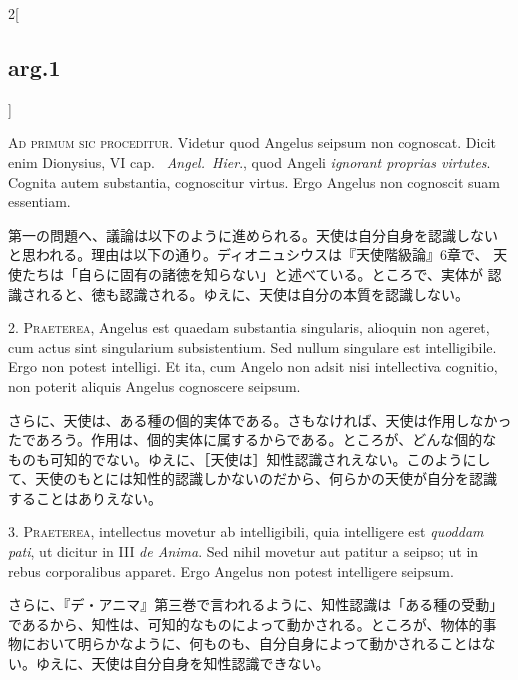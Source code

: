 \documentclass[paper=a4paper,fontsize=10pt,jafontsize=9pt,titlepage]{jlreq}
\begin{document}
\begin{paracol}{2}[\subsection{arg.1}]

{\huge A}{\scshape d primum sic proceditur}. Videtur quod Angelus
seipsum non cognoscat. Dicit enim Dionysius, VI cap.~{\itshape
Angel.~Hier}., quod Angeli {\itshape ignorant proprias
virtutes}. Cognita autem substantia, cognoscitur virtus. Ergo Angelus
non cognoscit suam essentiam.

\switchcolumn

第一の問題へ、議論は以下のように進められる。天使は自分自身を認識しない
と思われる。理由は以下の通り。ディオニュシウスは『天使階級論』6章で、
天使たちは「自らに固有の諸徳を知らない」と述べている。ところで、実体が
認識されると、徳も認識される。ゆえに、天使は自分の本質を認識しない。


2. {\scshape Praeterea}, Angelus est quaedam substantia singularis,
alioquin non ageret, cum actus sint singularium subsistentium. Sed
nullum singulare est intelligibile. Ergo non potest intelligi. Et ita,
cum Angelo non adsit nisi intellectiva cognitio, non poterit aliquis
Angelus cognoscere seipsum.

\switchcolumn

さらに、天使は、ある種の個的実体である。さもなければ、天使は作用しなかっ
たであろう。作用は、個的実体に属するからである。ところが、どんな個的な
ものも可知的でない。ゆえに、［天使は］知性認識されえない。このようにし
て、天使のもとには知性的認識しかないのだから、何らかの天使が自分を認識
することはありえない。


3. {\scshape Praeterea}, intellectus movetur ab intelligibili, quia
intelligere est {\itshape quoddam pati}, ut dicitur in III {\itshape
de Anima}. Sed nihil movetur aut patitur a seipso; ut in rebus
corporalibus apparet. Ergo Angelus non potest intelligere seipsum.

\switchcolumn

さらに、『デ・アニマ』第三巻で言われるように、知性認識は「ある種の受動」
であるから、知性は、可知的なものによって動かされる。ところが、物体的事
物において明らかなように、何ものも、自分自身によって動かされることはな
い。ゆえに、天使は自分自身を知性認識できない。


\end{paracol}
\end{document}
